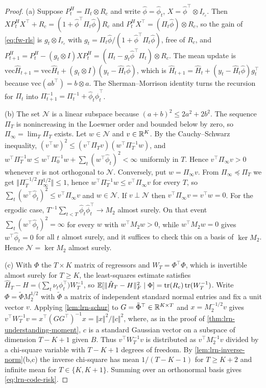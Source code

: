 \begin{proof}
(a) Suppose $P^H_t=\Pi_t\otimes R_c$ and write $\hat\phi=\hat\phi_t$, $X=\hat\phi^\top\otimes I_{r_c}$. Then $XP^H_tX^\top+R_c=(1+\hat\phi^\top\Pi_t\hat\phi)R_c$ and $P^H_tX^\top=(\Pi_t\hat\phi)\otimes R_c$, so the gain of \cref{eq:fw-rls} is $g_t\otimes I_{r_c}$ with $g_t=\Pi_t\hat\phi/(1+\hat\phi^\top\Pi_t\hat\phi)$, free of $R_c$, and $P^H_{t+1}=P^H_t-(g_t\otimes I)X P^H_t=(\Pi_t-g_t\hat\phi^\top\Pi_t)\otimes R_c$. The mean update is $\mathrm{vec}\hat H_{t+1}=\mathrm{vec}\hat H_t+(g_t\otimes I)(y_t-\hat H_t\hat\phi)$, which is $\hat H_{t+1}=\hat H_t+(y_t-\hat H_t\hat\phi)g_t^\top$ because $\mathrm{vec}(ab^\top)=b\otimes a$. The Sherman--Morrison identity turns the recursion for $\Pi_t$ into $\Pi_{t+1}^{-1}=\Pi_t^{-1}+\hat\phi_t\hat\phi_t^\top$.

(b) The set $\mathcal N$ is a linear subspace because $(a+b)^2\le2a^2+2b^2$. The sequence $\Pi_T$ is nonincreasing in the Loewner order and bounded below by zero, so $\Pi_\infty=\lim_T\Pi_T$ exists. Let $w\in\mathcal N$ and $v\in\mathbb{R}^K$. By the Cauchy--Schwarz inequality, $(v^\top w)^2\le(v^\top\Pi_Tv)(w^\top\Pi_T^{-1}w)$, and $w^\top\Pi_T^{-1}w\le w^\top\Pi_0^{-1}w+\sum_t(w^\top\hat\phi_t)^2<\infty$ uniformly in $T$. Hence $v^\top\Pi_\infty v>0$ whenever $v$ is not orthogonal to $\mathcal N$. Conversely, put $w=\Pi_\infty v$. From $\Pi_\infty\preceq\Pi_T$ we get $\Vert\Pi_T^{-1/2}\Pi_\infty^{1/2}\Vert\le1$, hence $w^\top\Pi_T^{-1}w\le v^\top\Pi_\infty v$ for every $T$, so $\sum_t(w^\top\hat\phi_t)^2\le v^\top\Pi_\infty v$ and $w\in\mathcal N$. If $v\perp\mathcal N$ then $v^\top\Pi_\infty v=v^\top w=0$. For the ergodic case, $T^{-1}\sum_{t<T}\hat\phi_t\hat\phi_t^\top\to M_2$ almost surely. On that event $\sum_t(w^\top\hat\phi_t)^2=\infty$ for every $w$ with $w^\top M_2w>0$, while $w^\top M_2w=0$ gives $w^\top\hat\phi_t=0$ for all $t$ almost surely, and it suffices to check this on a basis of $\ker M_2$. Hence $\mathcal N=\ker M_2$ almost surely.

(c) With $\Phi$ the $T\times K$ matrix of regressors and $W_T=\Phi^\top\Phi$, which is invertible almost surely for $T\ge K$, the least-squares estimate satisfies $\hat H_T-H=\bigl(\sum_t\nu_t\phi_t^\top\bigr)W_T^{-1}$, so $\mathbb{E}[\Vert\hat H_T-H\Vert_F^2\mid\Phi]=\operatorname{tr}(R_c)\operatorname{tr}(W_T^{-1})$. Write $\Phi=\tilde\Phi M_2^{1/2}$ with $\tilde\Phi$ a matrix of independent standard normal entries and fix a unit vector $v$. Applying \cref{lem:lrn-schur} to $G=\tilde\Phi^\top\in\mathbb{R}^{K\times T}$ and $x=M_2^{-1/2}v$ gives $v^\top W_T^{-1}v=x^\top(GG^\top)^{-1}x=\Vert x\Vert^2/\Vert c\Vert^2$, where, as in the proof of \cref{thm:lrn-understanding-moment}, $c$ is a standard Gaussian vector on a subspace of dimension $T-K+1$ given $B$. Thus $v^\top W_T^{-1}v$ is distributed as $v^\top M_2^{-1}v$ divided by a chi-square variable with $T-K+1$ degrees of freedom. By \cref{lem:lrn-inverse-norm}(b,c) the inverse chi-square has mean $1/(T-K-1)$ for $T\ge K+2$ and infinite mean for $T\in\{K,K+1\}$. Summing over an orthonormal basis gives \cref{eq:lrn-code-risk}.
\end{proof}

